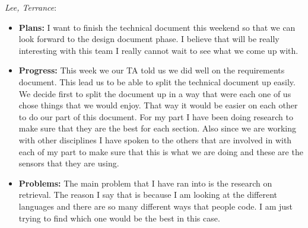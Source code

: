\documentclass[10pt,draftclsnofoot,onecolumn]{IEEEtran}
\newcommand{\subsubsubsection}[1]{
	\hfill\break\textit{#1}:
}
\begin{document}
\subsubsubsection{Lee, Terrance}
\begin{itemize}
	\item \textbf{Plans: }
	I want to finish the technical document this weekend so that we can look forward to the design document phase. I believe that will be really interesting with this team I really cannot wait to see what we come up with.
	\item \textbf{Progress: }
	This week we our TA told us we did well on the requirements document. This lead us to be able to split the technical document up easily. We decide first to split the document up in a way that were each one of us chose things that we would enjoy. That way it would be easier on each other to do our part of this document. For my part I have been doing research to make sure that they are the best for each section. Also since we are working with other disciplines I have spoken to the others that are involved in with each of my part to make sure that this is what we are doing and these are the sensors that they are using.
	\item \textbf{Problems: }
	The main problem that I have ran into is the research on retrieval. The reason I say that is because I am looking at the different languages and there are so many different ways that people code. I am just trying to find which one would be the best in this case.
\end{itemize}
\end{document}
